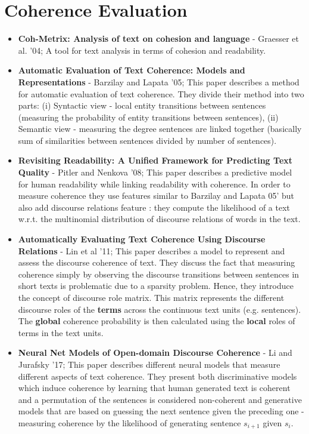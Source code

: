 
\section{Coherence Evaluation}
\begin{itemize}
\item \textbf{Coh-Metrix: Analysis of text on cohesion and language} - Graesser et al. '04; A tool for text analysis in terms of cohesion and readability. 
\item \textbf{Automatic Evaluation of Text Coherence: Models and Representations} - Barzilay and Lapata '05; This paper describes a method for automatic evaluation of text coherence. They divide their method into two parts: (i) Syntactic view - local entity transitions between sentences (measuring the probability of entity transitions between sentences), (ii) Semantic view - measuring the degree sentences are linked together (basically sum of similarities between sentences divided by number of sentences).

\item \textbf{Revisiting Readability: A Unified Framework for Predicting Text Quality} - Pitler and Nenkova '08; This paper describes a predictive model for human readability while linking readability with coherence. In order to measure coherence they use features similar to Barzilay and Lapata 05' but also add discourse relations feature : they compute the likelihood of a text w.r.t. the multinomial distribution of discourse relations of words in the text.

\item \textbf{Automatically Evaluating Text Coherence Using Discourse Relations} - Lin et al '11; This paper describes a model to represent and assess the discourse coherence of text. They discuss the fact that measuring coherence simply by observing the discourse transitions between sentences in short texts is problematic due to a sparsity problem. Hence, they introduce the concept of discourse role matrix. This matrix represents the different discourse roles of the \textbf{terms} across the continuous text units (e.g. sentences). The \textbf{global} coherence probability is then calculated using the \textbf{local} roles of terms in the text units.



\item \textbf{Neural Net Models of Open-domain Discourse Coherence} - Li and Jurafsky '17; This paper describes different neural models that measure different aspects of text coherence. They present both discriminative models which induce coherence by learning that human generated text is coherent and a permutation of the sentences is considered non-coherent and generative models that are based on guessing the next sentence given the preceding one - measuring coherence by the likelihood of generating sentence $s_{i+1}$ given $s_i$.

\end{itemize}


